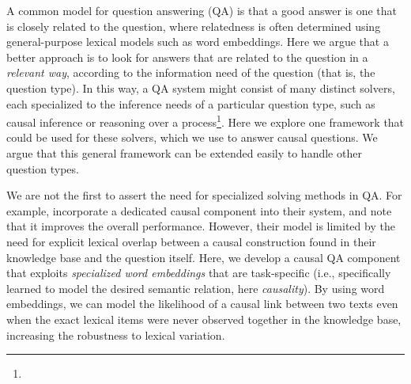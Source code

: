 
A common model for question answering (QA) is that a good answer is one that is closely related to the question, where relatedness is often determined using general-purpose lexical models such as word embeddings. 
Here we argue that a better approach is to look for answers that are related to the question in a {\em relevant way}, according to the information need of the question (that is, the question type).
In this way, a QA system might consist of many distinct solvers, each specialized to the inference needs of a particular question type, such as causal inference or reasoning over a process\footnote{}.  Here we explore one framework that could be used for these solvers, which we use to answer causal questions.  We argue that this general framework can be extended easily to handle other question types.

We are not the first to assert the need for specialized solving methods in QA.  For example, \citet{oh2013question} incorporate a dedicated causal component into their system, and note that it improves the overall performance.  However, their model is limited by the need for explicit lexical overlap between a causal construction found in their knowledge base and the question itself.  Here, we develop a causal QA component that exploits \textit{specialized word embeddings} that are task-specific (i.e., specifically learned to model the desired semantic relation, here \textit{causality}).  
By using word embeddings, we can model the likelihood of a causal link between two texts even when the exact lexical items were never observed together in the knowledge base, increasing the robustness to lexical variation.

